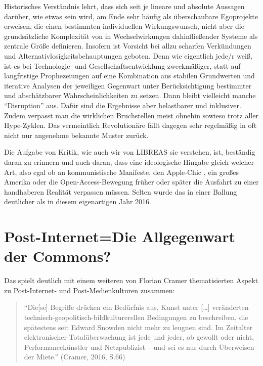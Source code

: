 \documentclass[a4paper,
fontsize=11pt,
oneside,
numbers=noperiodatend,
parskip=half-,
bibliography=totoc,
final
]{scrartcl}
\begin{document}
Historisches Verständnis lehrt, dass sich seit je lineare und absolute
Aussagen darüber, wie etwas sein wird, am Ende sehr häufig als
überschaubare Egoprojekte erweisen, die einen bestimmten individuellen
Wirkungswunsch, nicht aber die grundsätzliche Komplexität von in
Wechselwirkungen dahinfließender Systeme als zentrale Größe definieren.
Insofern ist Vorsicht bei allzu scharfen Verkündungen und
Alternativlosigkeitsbehauptungen geboten. Denn wie eigentlich jede/r
weiß, ist es bei Technologie- und Gesellschaftsentwicklung zweckmäßiger,
statt auf langfristige Prophezeiungen auf eine Kombination aus stabilen
Grundwerten und iterative Analysen der jeweiligen Gegenwart unter
Berücksichtigung bestimmter und abschätzbarer Wahrscheinlichkeiten zu
setzen. Dann bleibt vielleicht manche \enquote{Disruption} aus. Dafür
sind die Ergebnisse aber belastbarer und inklusiver. Zudem verpasst man
die wirklichen Bruchstellen meist ohnehin sowieso trotz aller
Hype-Zyklen. Das vermeintlich Revolutionäre fällt dagegen sehr
regelmäßig in oft nicht nur angenehme bekannte Muster zurück.

Die Aufgabe von Kritik, wie auch wir von LIBREAS sie verstehen, ist,
beständig daran zu erinnern und auch daran, dass eine ideologische
Hingabe gleich welcher Art, also egal ob an kommunistische Manifeste,
den Apple-Chic , ein großes Amerika oder die Open-Access-Bewegung früher
oder später die Ausfahrt zu einer handhaberen Realität verpassen müssen.
Selten wurde das in einer Ballung deutlicher als in diesem eigenartigen
Jahr 2016.

\section*{Post-Internet=Die Allgegenwart der
Commons?}\label{post-internetdie-allgegenwart-der-commons}

Das spielt deutlich mit einem weiteren von Florian Cramer thematisierten
Aspekt zu Post-Internet- und Post-Medienkulturen zusammen:

\begin{quote}
\enquote{Die{[}se{]} Begriffe drücken ein Bedürfnis aus, Kunst unter
{[}\ldots{}{]} veränderten technisch-geopolitisch-bildkulturerellen
Bedingungen zu beschreiben, die spätestens seit Edward Snowden nicht
mehr zu leugnen sind. Im Zeitalter elektronischer Totalüberwachung ist
jede und jeder, ob gewollt oder nicht, Performancekünstler und
Netzpublizist -- und sei es nur durch Überweisen der Miete.} (Cramer,
2016, S.66)
\end{quote}
\end{document}
